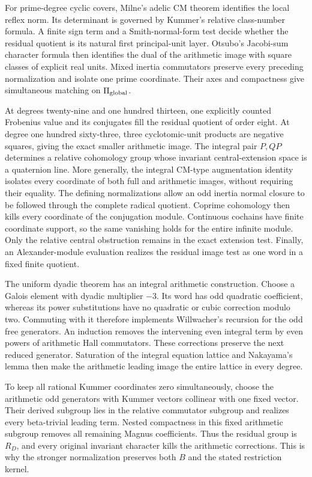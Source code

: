 \documentclass[11pt,a4paper]{article}
\theoremstyle{definition}
\theoremstyle{remark}
\begin{document}
For prime-degree cyclic covers, Milne's adelic CM theorem identifies
the local reflex norm. Its determinant is governed by Kummer's relative
class-number formula. A finite sign term and a Smith-normal-form test
decide whether the residual quotient is its natural first principal-unit
layer. Otsubo's Jacobi-sum character formula then identifies the dual of
the arithmetic image with square classes of explicit real units.
Mixed inertia commutators preserve every preceding normalization and
isolate one prime coordinate. Their axes and compactness give
simultaneous matching on \(\Pi_{\rm global}\).

At degrees twenty-nine and one hundred thirteen, one explicitly counted
Frobenius value and its conjugates fill the residual quotient of order
eight. At degree one hundred sixty-three, three cyclotomic-unit products
are negative squares, giving the exact smaller arithmetic image.
The integral pair \(P,QP\) determines a relative cohomology group whose
invariant central-extension space is a quaternion line. More generally,
the integral CM-type augmentation identity isolates every coordinate
of both full and arithmetic images, without requiring their equality.
The defining normalizations allow an odd inertia normal closure to be
followed through the complete radical quotient. Coprime cohomology
then kills every coordinate of the conjugation module. Continuous
cochains have finite coordinate support, so the same vanishing holds
for the entire infinite module. Only the relative central obstruction
remains in the exact extension test.
Finally, an Alexander-module evaluation realizes the residual image
test as one word in a fixed finite quotient.

The uniform dyadic theorem has an integral arithmetic construction.
Choose a Galois element with dyadic multiplier $-3$. Its word has
odd quadratic coefficient, whereas its power substitutions have no
quadratic or cubic correction modulo two. Commuting with it therefore
implements Willwacher's recursion for the odd free generators.
An induction removes the intervening even integral term by even
powers of arithmetic Hall commutators. These corrections preserve
the next reduced generator. Saturation of the integral equation
lattice and Nakayama's lemma then make the arithmetic leading
image the entire lattice in every degree.

To keep all rational Kummer coordinates zero simultaneously,
choose the arithmetic odd generators with Kummer vectors collinear
with one fixed vector. Their derived subgroup lies in the relative
commutator subgroup and realizes every beta-trivial leading term.
Nested compactness in this fixed arithmetic subgroup removes all
remaining Magnus coefficients. Thus the residual group is $R_D$,
and every original invariant character kills the arithmetic
corrections. This is why the stronger normalization preserves
both $B$ and the stated restriction kernel.
\end{document}
